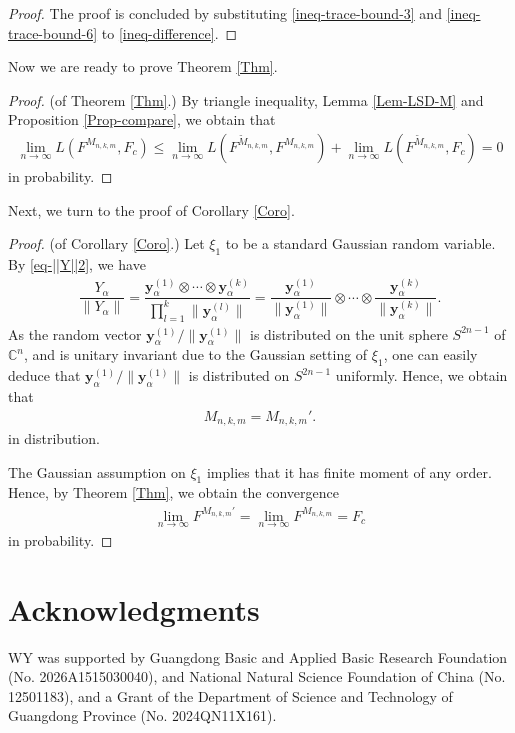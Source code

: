 \documentclass[12pt]{article}
\numberwithin{equation}{section} \theoremstyle{plain}
\def\bC{\mathbb C}
\def\y{\mathbf y}
\begin{document}
\begin{proof}
\bigskip

The proof is concluded by substituting \eqref{ineq-trace-bound-3} and \eqref{ineq-trace-bound-6} to \eqref{ineq-difference}.
\end{proof}

Now we are ready to prove Theorem \ref{Thm}.

\begin{proof}(of Theorem \ref{Thm}.)
By triangle inequality, Lemma \ref{Lem-LSD-M} and Proposition \ref{Prop-compare}, we obtain that
\begin{align*}
    \lim_{n \to \infty} L \left( F^{M_{n,k,m}}, F_c \right)
    \le \lim_{n \to \infty} L \left( F^{\widetilde M_{n,k,m}}, F^{M_{n,k,m}} \right) + \lim_{n \to \infty} L \left( F^{\widetilde M_{n,k,m}}, F_c \right)
    = 0 
\end{align*}
in probability.
\end{proof}

Next, we turn to the proof of Corollary \ref{Coro}.

\begin{proof}(of Corollary \ref{Coro}.)
Let $\xi_1$ to be a standard Gaussian random variable.
By \eqref{eq-||Y||2}, we have
\begin{align*}
    \dfrac{Y_\alpha}{\|Y_\alpha\|}
    = \dfrac{\y_{\alpha}^{(1)} \otimes \cdots \otimes \y_{\alpha}^{(k)}}{\prod_{l=1}^k \|\y_\alpha^{(l)}\|}
    = \dfrac{\y_{\alpha}^{(1)}}{\|\y_\alpha^{(1)}\|} \otimes \cdots \otimes \dfrac{\y_{\alpha}^{(k)}}{\|\y_\alpha^{(k)}\|}.
\end{align*}
As the random vector $\y_{\alpha}^{(1)}/\|\y_{\alpha}^{(1)}\|$ is distributed on the unit sphere $S^{2n-1}$ of $\bC^n$, and is unitary invariant due to the Gaussian setting of $\xi_1$, one can easily deduce that $\y_{\alpha}^{(1)}/\|\y_{\alpha}^{(1)}\|$ is distributed on $S^{2n-1}$ uniformly.
Hence, we obtain that
\begin{align*}
    M_{n,k,m} = M_{n,k,m}'.
\end{align*}
in distribution.

The Gaussian assumption on $\xi_1$ implies that it has finite moment of any order. Hence, by Theorem \ref{Thm}, we obtain the convergence
\begin{align*}
    \lim_{n \to \infty} F^{M_{n,k,m}'} = \lim_{n \to \infty} F^{M_{n,k,m}} = F_c
\end{align*}
in probability.


\end{proof}


\section*{Acknowledgments} 

WY was supported by Guangdong Basic and Applied Basic Research Foundation (No. 2026A1515030040), and National Natural Science Foundation of China (No. 12501183), and a Grant of the Department of Science and Technology of Guangdong Province (No. 2024QN11X161).




\end{document}
